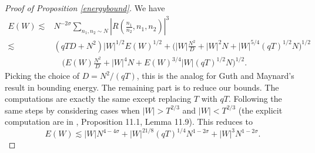 \begin{proof}[Proof of Proposition \ref{energybound}]
    We have 
    \begin{align*}
    E(W)\lesssim& N^{-2\sigma}\sum_{n_1,n_2\sim N}\left|R\left(\frac{n_1}{n_2},n_1,n_2\right) \right|^3 \\
    {\lesssim}& (qTD+N^2)|W|^{1/2}E(W)^{1/2} + 
    \Bigg(|W|\frac{N^2}{D}+ |W|^2N + |W|^{5/4}(qT)^{1/2}N\Bigg)^{1/2}\\ &\quad
    \Bigg(E(W)\frac{N^2}{D}+ |W|^4N+  E(W)^{3/4}|W|(qT)^{1/2}N\Bigg)^{1/2}.
    \end{align*}
    Picking the choice of $D=N^2/(qT)$, this is the analog for Guth and Maynard's result in bounding energy. The remaining part is to reduce our bounds. The computations are exactly the same except replacing $T$ with $qT$. Following the same steps by considering cases when $|W|>T^{2/3}$ and $|W|<T^{2/3}$ (the explicit computation are in \cite{GM2024}, Proposition 11.1, Lemma 11.9). This reduces to\[
E(W)\lesssim |W|N^{4-4\sigma}+|W|^{21/8}(qT)^{1/4}N^{1-2\sigma}+|W|^3N^{1-2\sigma}.
\]
\end{proof}

